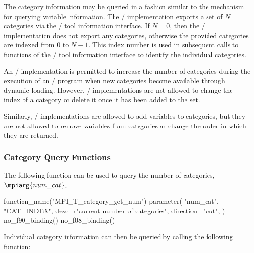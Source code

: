 The category information may be queried in a fashion similar to the
mechanism for querying variable information.  The \MPI/ implementation
exports a set of $N$ categories via the \MPI/ tool information interface.
If $N=0$, then the \MPI/ implementation does not export any categories,
otherwise the provided categories are indexed from $0$ to $N-1$.  This
index number is used in subsequent calls to functions of the \MPI/ tool
information interface to identify the individual categories.

An \MPI/ implementation is permitted to increase the number of categories
during the execution of an \MPI/ program when new categories become
available through dynamic loading.  However, \MPI/ implementations are not
allowed to change the index of a category or delete it once it has been
added to the set.

Similarly, \MPI/ implementations are allowed to add variables to
categories, but they are not allowed to remove variables from categories or
change the order in which they are returned.

\subsubsection{Category Query Functions}

The following function can be used to query the number of categories, $\mpiarg{num\_cat}$.

\begin{mpi-binding}
    function_name("MPI_T_category_get_num")
    parameter(
        "num_cat",
        "CAT_INDEX",
        desc=r"current number of categories",
        direction="out",
    )
    no_f90_binding()
    no_f08_binding()
\end{mpi-binding}

Individual category information can then be queried by calling the
following function:

